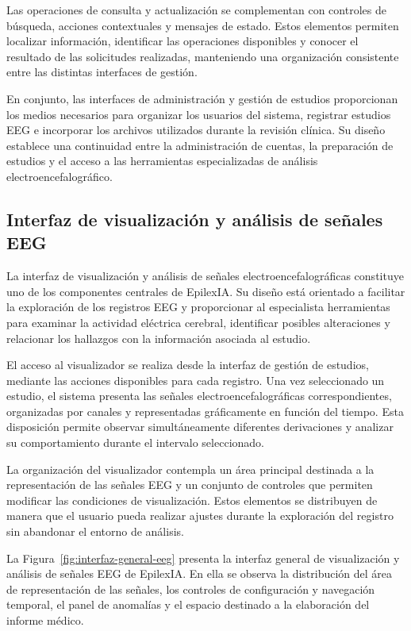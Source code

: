 Las operaciones de consulta y actualización se complementan
con controles de búsqueda, acciones contextuales y mensajes
de estado. Estos elementos permiten localizar información,
identificar las operaciones disponibles y conocer el resultado
de las solicitudes realizadas, manteniendo una organización
consistente entre las distintas interfaces de gestión.

En conjunto, las interfaces de administración y gestión de
estudios proporcionan los medios necesarios para organizar
los usuarios del sistema, registrar estudios EEG e incorporar
los archivos utilizados durante la revisión clínica. Su
diseño establece una continuidad entre la administración
de cuentas, la preparación de estudios y el acceso a las
herramientas especializadas de análisis electroencefalográfico.


\subsection{Interfaz de visualización y análisis de señales EEG}

La interfaz de visualización y análisis de señales electroencefalográficas constituye uno de los componentes centrales de EpilexIA. Su diseño está orientado a facilitar la exploración de los registros EEG y proporcionar al especialista herramientas para examinar la actividad eléctrica cerebral, identificar posibles alteraciones y relacionar los hallazgos con la información asociada al estudio.

El acceso al visualizador se realiza desde la interfaz de gestión de estudios, mediante las acciones disponibles para cada registro. Una vez seleccionado un estudio, el sistema presenta las señales electroencefalográficas correspondientes, organizadas por canales y representadas gráficamente en función del tiempo. Esta disposición permite observar simultáneamente diferentes derivaciones y analizar su comportamiento durante el intervalo seleccionado.

La organización del visualizador contempla un área principal destinada a la representación de las señales EEG y un conjunto de controles que permiten modificar las condiciones de visualización. Estos elementos se distribuyen de manera que el usuario pueda realizar ajustes durante la exploración del registro sin abandonar el entorno de análisis.

La Figura~\ref{fig:interfaz-general-eeg} presenta la interfaz general de visualización y análisis de señales EEG de EpilexIA. En ella se observa la distribución del área de representación de las señales, los controles de configuración y navegación temporal, el panel de anomalías y el espacio destinado a la elaboración del informe médico.

